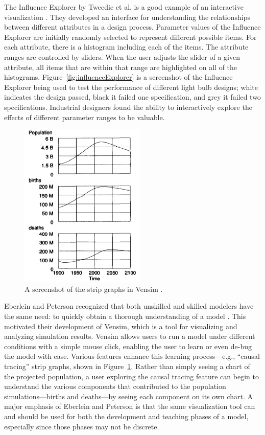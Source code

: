 The Influence Explorer by Tweedie et al. is a good example of an interactive visualization \cite{tweedie1995}.  They developed an interface for understanding the relationships between different attributes in a design process.  Parameter values of the Influence Explorer are initially randomly selected to represent different possible items.  For each attribute, there is a histogram including each of the items.  The attribute ranges are controlled by sliders.  When the user adjusts the slider of a given attribute, all items that are within that range are highlighted on all of the histograms.  Figure~\ref{fig:influenceExplorer} is a screenshot of the Influence Explorer being used to test the performance of different light bulb designs; white indicates the design passed, black it failed one specification, and grey it failed two specifications.  Industrial designers found the ability to interactively explore the effects of different parameter ranges to be valuable.


\begin{figure}[h]
	\centering
	\includegraphics[width=6cm]{figures/eps/vensim.eps}
	\caption{A screenshot of the strip graphs in Vensim \cite{eberlein1992}.}
	\label{fig:vensim}
\end{figure}

Eberlein and Peterson recognized that both unskilled and skilled modelers have the same need: to quickly obtain a thorough understanding of a model \cite{eberlein1992}.  This motivated their development of Vensim, which is a tool for visualizing and analyzing simulation results.  Vensim allows users to run a model under different conditions with a simple mouse click, enabling the user to learn or even de-bug the model with ease.  Various features enhance this learning process---e.g., ``causal tracing'' strip graphs, shown in Figure~\ref{fig:vensim}.  Rather than simply seeing a chart of the projected population, a user exploring the causal tracing feature can begin to understand the various components that contributed to the population simulations---births and deaths---by seeing each component on its own chart.  A major emphasis of Eberlein and Peterson is that the same visualization tool can and should be used for both the development and teaching phases of a model, especially since those phases may not be discrete.
